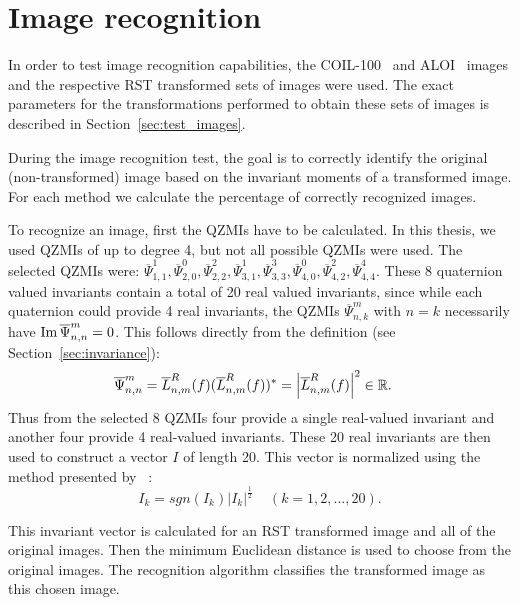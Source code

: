 \section{Image recognition}\label{sec:recognition}
In order to test image recognition capabilities, the COIL-100~\cite{coil} and ALOI~\cite{aloi} images and the respective RST transformed sets of images were used. The exact parameters for the transformations performed to obtain these sets of images is described in Section~\ref{sec:test_images}.

During the image recognition test, the goal is to correctly identify the original (non-transformed) image based on the invariant moments of a transformed image. For each method we calculate the percentage of correctly recognized images.

To recognize an image, first the QZMIs have to be calculated. In this thesis, we used QZMIs of up to degree 4, but not all possible QZMIs were used. The selected QZMIs were: $\overline{\Psi}_{1,1}^1, \overline{\Psi}_{2,0}^0, \overline{\Psi}_{2,2}^2, \overline{\Psi}_{3,1}^1, \overline{\Psi}_{3,3}^3, \overline{\Psi}_{4,0}^0, \overline{\Psi}_{4,2}^2, \overline{\Psi}_{4,4}^4$. These 8 quaternion valued invariants contain a total of 20 real valued invariants, since while each quaternion could provide 4 real invariants, the QZMIs $\overline{\Psi}_{n,k}^m$ with $n = k$ necessarily have $\operatorname{Im}{\overline{\Psi}_{n,n}^m} = 0$.
This follows directly from the definition (see Section~\ref{sec:invariance}): 
\begin{gather*}
    \begin{split}
        \overline{\Psi}_{n,n}^m &= \overline{L}_{n,m}^R(f)(\overline{L}_{n,m}^R(f))^* = \left|\overline{L}_{n,m}^R(f)\right|^2 \in \mathbb{R}.
    \end{split}
\end{gather*}
Thus from the selected 8 QZMIs four provide a single real-valued invariant and another four provide 4 real-valued invariants. These 20 real invariants are then used to construct a vector $I$ of length 20.
This vector is normalized using the method presented by \citeauthor{affine_color}~\cite{affine_color}:
$$
I_k = sgn(I_k)\left|I_k\right|^\frac{1}{2} \;\;\;\; (k = 1,2,\ldots,20).
$$

This invariant vector is calculated for an RST transformed image and all of the original images. Then the minimum Euclidean distance is used to choose from the original images. The recognition algorithm classifies the transformed image as this chosen image.

